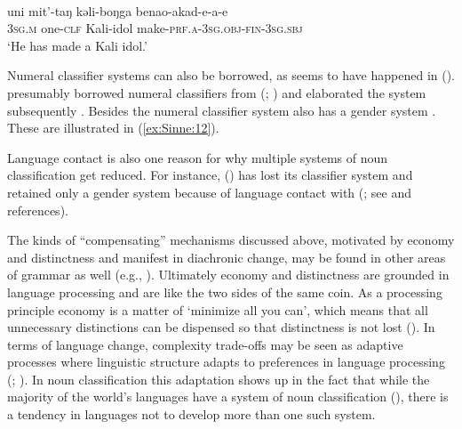 \documentclass[output=collectionpaper]{langsci/langscibook}
\begin{document}
\ea
\label{ex:Sinne:11}
\\
\gll uni mit'-taŋ kəli-boŋga benao-akad-e-a-e \\
\textsc{3sg.m} one-\textsc{clf} Kali-idol make-\textsc{prf.a-3sg.obj-fin-3sg.sbj}\\
\glt `He has made a Kali idol.'\\
\z

Numeral classifier systems can also be borrowed, as seems to have happened in  ().  presumably borrowed numeral classifiers from  (; ) and elaborated the system subsequently \citep[117--118]{Emeneau1980}. Besides the numeral classifier system  also has a gender system \citep{Steever1998}. These are illustrated in (\ref{ex:Sinne:12}).

%

Language contact is also one reason for why multiple systems of noun classification get reduced. For instance,  () has lost its classifier system and retained only a gender system because of language contact with  (; see \citealt[386]{Aikhenvald2000} and references).

The kinds of ``compensating'' mechanisms discussed above, motivated by economy and distinctness and manifest in diachronic change, may be found in other areas of grammar as well (e.g., \citealt{Sinnemaeki2014}). Ultimately economy and distinctness are grounded in language processing and are like the two sides of the same coin. As a processing principle economy is a matter of `minimize all you can', which means that all unnecessary distinctions can be dispensed so that distinctness is not lost (\citealt{Bornkessel-Schlesewsky2009}). In terms of language change, complexity trade-offs may be seen as adaptive processes where linguistic structure adapts to preferences in language processing (\citealt{Sinnemaeki2014b}; \citealt{Bickel2015}). In noun classification this adaptation shows up in the fact that while the majority of the world's languages have a system of noun classification (), there is a tendency in languages not to develop more than one such system.
\end{document}
